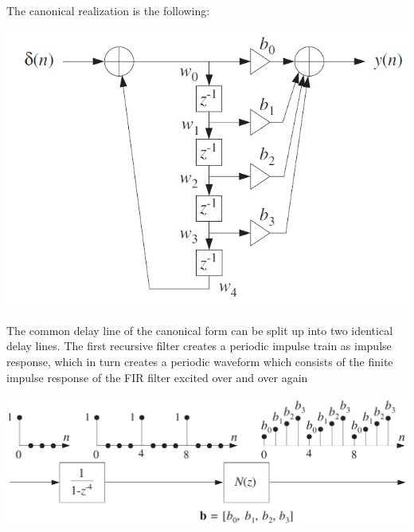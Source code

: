 The canonical realization is the following:
\begin{center}
	\includegraphics[width=\linewidth]{images/SignProcApp_PeriodicWaveFormGen.jpg}
\end{center}

The common delay line of the canonical form can be split up into two identical delay lines.
The first recursive filter creates a periodic impulse train as impulse response, which in turn creates a periodic waveform which consists of the finite impulse response of the FIR filter excited over and over again
\begin{center}
  \includegraphics[width=\linewidth]{images/SignProcApp_ImpulseTrain.png}
\end{center}

